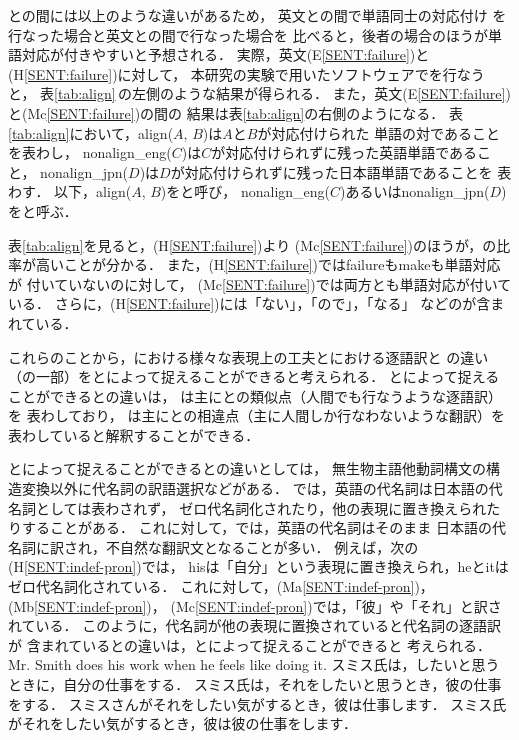 \documentclass[japanese]{jnlp_1.4}
\newcommand{\AL}{}
\newcommand{\NAL}{}
\newcommand{\align}{}
\newcommand{\HUM}{}
\newcommand{\MT}{}
\newenvironment{SENT3}{}{}
\begin{document}
{\HUM}と{\MT}の間には以上のような違いがあるため，
英文と{\HUM}の間で単語同士の対応付け
を行なった場合と英文と{\MT}の間で行なった場合を
比べると，後者の場合のほうが単語対応が付きやすいと予想される．
実際，英文(E\ref{SENT:failure})と{\HUM}(H\ref{SENT:failure})に対して，
本研究の実験で用いた{\align}ソフトウェアで{\align}を行なうと，
表\ref{tab:align}\,の左側のような結果が得られる．
また，英文(E\ref{SENT:failure})と{\MT}(Mc\ref{SENT:failure})の間の
{\align}結果は表\ref{tab:align}の右側のようになる．
表\ref{tab:align}において，align($A$, $B$)は$A$と$B$が対応付けられた
単語の対であることを表わし，
nonalign\_eng($C$)は$C$が対応付けられずに残った英語単語であること，
nonalign\_jpn($D$)は$D$が対応付けられずに残った日本語単語であることを
表わす．
以下，align($A$, $B$)を{\AL}と呼び，
nonalign\_eng($C$)あるいはnonalign\_jpn($D$)を{\NAL}と呼ぶ．

\begin{table}[t]
\caption{英文(E\ref{SENT:failure})と{\HUM}(H\ref{SENT:failure})
の{\align}結果と
英文(E\ref{SENT:failure})と{\MT}(Mc\ref{SENT:failure})の{\align}結果}
\label{tab:align}

\end{table}

表\ref{tab:align}を見ると，{\HUM}(H\ref{SENT:failure})より
{\MT}(Mc\ref{SENT:failure})のほうが，{\AL}の比率が高いことが分かる．
また，{\HUM}(H\ref{SENT:failure})ではfailureもmakeも単語対応が
付いていないのに対して，
{\MT}(Mc\ref{SENT:failure})では両方とも単語対応が付いている．
さらに，{\HUM}(H\ref{SENT:failure})には「ない」，「ので」，「なる」
などの{\NAL}が含まれている．

これらのことから，{\HUM}における様々な表現上の工夫と{\MT}における逐語訳と
の違い（の一部）を{\AL}と{\NAL}によって捉えることができると考えられる．
{\AL}と{\NAL}によって捉えることができる{\HUM}と{\MT}の違いは，
{\AL}は主に{\HUM}と{\MT}の類似点（人間でも行なうような逐語訳）を
表わしており，
{\NAL}は主に{\HUM}と{\MT}の相違点（主に人間しか行なわないような翻訳）を
表わしていると解釈することができる．

{\AL}と{\NAL}によって捉えることができる{\HUM}と{\MT}の違いとしては，
無生物主語他動詞構文の構造変換以外に代名詞の訳語選択などがある．
{\HUM}では，英語の代名詞は日本語の代名詞としては表わされず，
ゼロ代名詞化されたり，他の表現に置き換えられたりすることがある．
これに対して，{\MT}では，英語の代名詞はそのまま
日本語の代名詞に訳され，不自然な翻訳文となることが多い．
例えば，次の{\HUM}(H\ref{SENT:indef-pron})では，
hisは「自分」という表現に置き換えられ，heとitはゼロ代名詞化されている．
これに対して，{\MT}(Ma\ref{SENT:indef-pron})，(Mb\ref{SENT:indef-pron})，
(Mc\ref{SENT:indef-pron})では，「彼」や「それ」と訳されている．
このように，代名詞が他の表現に置換されている{\HUM}と代名詞の逐語訳が
含まれている{\MT}との違いは，{\AL}と{\NAL}によって捉えることができると
考えられる． 
\begin{SENT3}
\sentE Mr. Smith does his work when he feels like doing it.
\sentH スミス氏は，したいと思うときに，自分の仕事をする．
\sentMa スミス氏は，それをしたいと思うとき，彼の仕事をする．
\sentMb スミスさんがそれをしたい気がするとき，彼は仕事します．
\sentMc スミス氏がそれをしたい気がするとき，彼は彼の仕事をします．
\label{SENT:indef-pron}
\end{SENT3}
\end{document}
